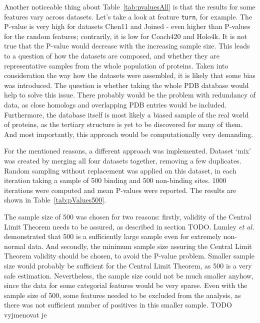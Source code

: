 Another noticeable thing about Table~\ref{tab:pvaluesAll} is that the results for some features vary across datasets. Let's take a look at feature \texttt{turn}, for example. The P-value is very high for datasets Chen11 and Joined - even higher than P-values for the random features; contrarily, it is low for Coach420 and Holo4k. It is not true that the P-value would decrease with the increasing sample size. This leads to a question of how the datasets are composed, and whether they are representative samples from the whole population of proteins. Taken into consideration the way how the datasets were assembled, it is likely that some bias was introduced. The question is whether taking the whole PDB database would help to solve this issue. There probably would be the problem with redundancy of data, as close homologs and overlapping PDB entries would be included. Furthermore, the database itself is most likely a biased sample of the real world of proteins, as the tertiary structure is yet to be discovered for many of them. And most importantly, this approach would be computationally very demanding.

For the mentioned reasons, a different approach was implemented. Dataset `mix' was created by merging all four datasets together, removing a few duplicates. Random sampling without replacement was applied on this dataset, in each iteration taking a sample of 500 binding and 500 non-binding sites. 1000 iterations were computed and mean P-values were reported. The results are shown in Table~\ref{tab:pValues500}. 

The sample size of 500 was chosen for two reasons: firstly,  validity of the Central Limit Theorem needs to be assured, as described in section TODO. Lumley \textit{et al.} \cite{lumley} demonstrated that 500 is a sufficiently large sample even for extremely non-normal data. And secondly, the minimum sample size assuring the Central Limit Theorem validity should be chosen, to avoid the P-value problem. Smaller sample size would probably be sufficient for the Central Limit Theorem, as 500 is a very safe estimation. Nevertheless, the sample size could not be much smaller anyhow, since the data for some categorial features would be very sparse. Even with the sample size of 500, some features needed to be excluded from the analysis, as there was not sufficient number of positives in this smaller sample. TODO vyjmenovat je

